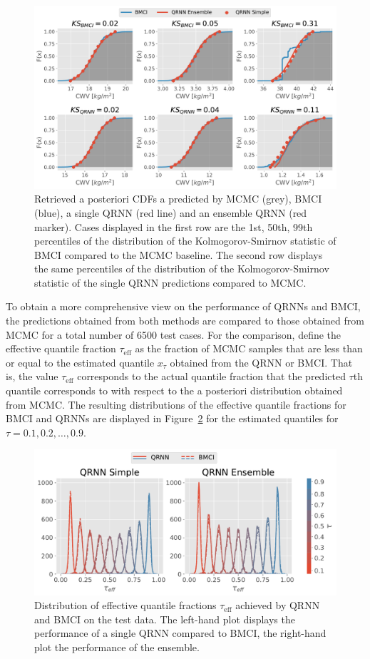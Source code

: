 \documentclass[journal abbreviation, manuscript]{copernicus}
\begin{document}
  \begin{figure}[hbpt!]
    \centering
    \includegraphics[width = 0.8\linewidth]{../plots/posterior_cdfs}
    \caption{Retrieved a posteriori CDFs a predicted by MCMC (grey), BMCI (blue),
      a single QRNN (red line) and an ensemble QRNN (red marker). Cases displayed in the first
      row are the 1st, 50th, 99th percentiles of the distribution of the Kolmogorov-Smirnov
      statistic of BMCI compared to the MCMC baseline. The second row displays the
      same percentiles of the distribution of the Kolmogorov-Smirnov statistic of the
      single QRNN predictions compared to MCMC.}
    \label{fig:cdfs}
  \end{figure}

  To obtain a more comprehensive view on the performance of QRNNs and BMCI, the
  predictions obtained from both methods are compared to those obtained from
  MCMC for a total number of 6500 test cases. For the comparison, define the
  effective quantile fraction $\tau_{\text{eff}}$ as the fraction of MCMC
  samples that are less than or equal to the estimated quantile $x_\tau$
  obtained from the QRNN or BMCI. That is, the value $\tau_\text{eff}$ corresponds
  to the actual quantile fraction that the predicted $\tau$th quantile
  corresponds to with respect to the a posteriori distribution obtained from
  MCMC. The resulting distributions of the effective quantile fractions for BMCI
  and QRNNs are displayed in Figure~\ref{fig:quantile_fractions} for the
  estimated quantiles for $\tau = 0.1, 0.2, \ldots, 0.9$.

  \begin{figure}[hbpt!]
    \centering
    \includegraphics[width = 0.8\linewidth]{../plots/quantile_fractions}
    \caption{Distribution of effective quantile fractions $\tau_\text{eff}$ achieved by
      QRNN and BMCI on the test data. The left-hand plot displays the performance of a
      single QRNN compared to BMCI, the right-hand plot the performance of the ensemble.}
    \label{fig:quantile_fractions}
  \end{figure}
\end{document}
